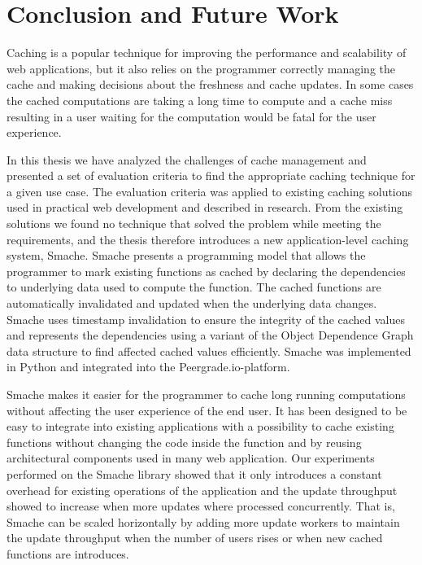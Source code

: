 \chapter{Conclusion and Future Work}
\label{chapter:conclusion}

Caching is a popular technique for improving the performance and scalability of web applications, but it also relies on the programmer correctly managing the cache and making decisions about the freshness and cache updates. In some cases the cached computations are taking a long time to compute and a cache miss resulting in a user waiting for the computation would be fatal for the user experience.

In this thesis we have analyzed the challenges of cache management and presented a set of evaluation criteria to find the appropriate caching technique for a given use case. The evaluation criteria was applied to existing caching solutions used in practical web development and described in research. From the existing solutions we found no technique that solved the problem while meeting the requirements, and the thesis therefore introduces a new application-level caching system, Smache. Smache presents a programming model that allows the programmer to mark existing functions as cached by declaring the dependencies to underlying data used to compute the function. The cached functions are automatically invalidated and updated when the underlying data changes. Smache uses timestamp invalidation to ensure the integrity of the cached values and represents the dependencies using a variant of the Object Dependence Graph data structure to find affected cached values efficiently. Smache was implemented in Python and integrated into the Peergrade.io-platform.

Smache makes it easier for the programmer to cache long running computations without affecting the user experience of the end user. It has been designed to be easy to integrate into existing applications with a possibility to cache existing functions without changing the code inside the function and by reusing architectural components used in many web application. Our experiments performed on the Smache library showed that it only introduces a constant overhead for existing operations of the application and the update throughput showed to increase when more updates where processed concurrently. That is, Smache can be scaled horizontally by adding more update workers to maintain the update throughput when the number of users rises or when new cached functions are introduces.

